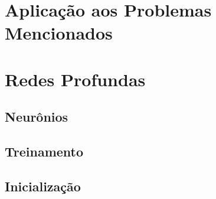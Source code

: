 \section{Aplicação aos Problemas Mencionados}
\label{sec:ann_application_mentioned_problem}



\section{Redes Profundas}
\label{sec:ann_deep_networks}



\subsection{Neurônios}
\label{subsec:ann_neurons}



\subsection{Treinamento}
\label{subsec:ann_training}



\subsection{Inicialização}
\label{subsec:ann_inicialization}
